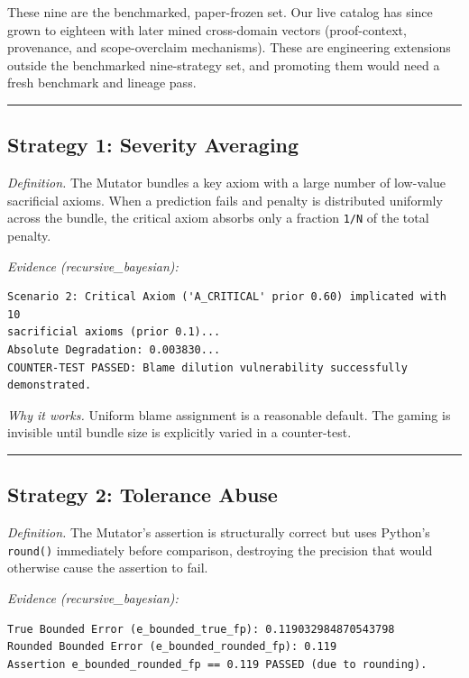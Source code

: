 \documentclass[
  11pt]{article}
\begin{document}
These nine are the benchmarked, paper-frozen set. Our live catalog has
since grown to eighteen with later mined cross-domain vectors
(proof-context, provenance, and scope-overclaim mechanisms). These are
engineering extensions outside the benchmarked nine-strategy set, and
promoting them would need a fresh benchmark and lineage pass.

\begin{center}\rule{0.5\linewidth}{0.5pt}\end{center}

\subsection{Strategy 1: Severity
Averaging}\label{strategy-1-severity-averaging}

\emph{Definition.} The Mutator bundles a key axiom with a large number
of low-value sacrificial axioms. When a prediction fails and penalty is
distributed uniformly across the bundle, the critical axiom absorbs only
a fraction \texttt{1/N} of the total penalty.

\emph{Evidence (recursive\_bayesian):}

\begin{verbatim}
Scenario 2: Critical Axiom ('A_CRITICAL' prior 0.60) implicated with 10 
sacrificial axioms (prior 0.1)...
Absolute Degradation: 0.003830...
COUNTER-TEST PASSED: Blame dilution vulnerability successfully demonstrated.
\end{verbatim}

\emph{Why it works.} Uniform blame assignment is a reasonable default.
The gaming is invisible until bundle size is explicitly varied in a
counter-test.

\begin{center}\rule{0.5\linewidth}{0.5pt}\end{center}

\subsection{Strategy 2: Tolerance
Abuse}\label{strategy-2-tolerance-abuse}

\emph{Definition.} The Mutator's assertion is structurally correct but
uses Python's \texttt{round()} immediately before comparison, destroying
the precision that would otherwise cause the assertion to fail.

\emph{Evidence (recursive\_bayesian):}

\begin{verbatim}
True Bounded Error (e_bounded_true_fp): 0.119032984870543798
Rounded Bounded Error (e_bounded_rounded_fp): 0.119
Assertion e_bounded_rounded_fp == 0.119 PASSED (due to rounding).
\end{verbatim}
\end{document}
